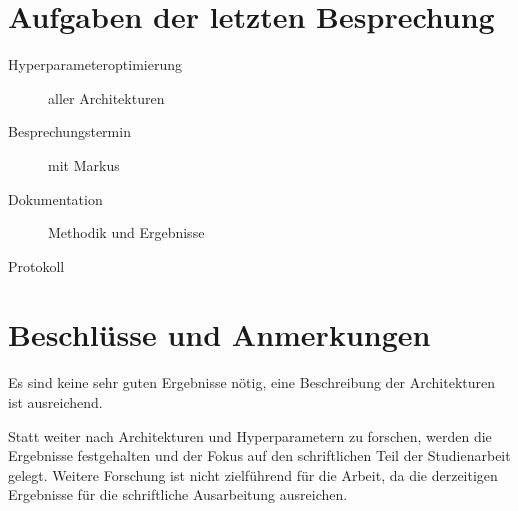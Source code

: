 
\newcommand{\Titel}{9. Protokoll}
\newcommand{\Teilnehmer}{Jonas Bürgel, Markus Reischl, Patrick Welter}
\newcommand{\DatumUndZeit}{04.04.2022 20:00-20:15}
\newcommand{\Ort}{Zoom Meeting}
\newcommand{\Thema}{Hyperparameteroptimierung}


\section{Aufgaben der letzten Besprechung}
\begin{description}
	\item[Hyperparameteroptimierung] aller Architekturen  \halfcheck
	\item[Besprechungstermin] mit Markus  \fullcheck
	\item[Dokumentation] Methodik und Ergebnisse  \halfcheck
	\item[Protokoll]  \fullcheck
\end{description}


\section{Beschlüsse und Anmerkungen}
\begin{description}[style=nextline]
	\item[Markus: Ergebnisse]
	Es sind keine sehr guten Ergebnisse nötig, eine Beschreibung der Architekturen ist ausreichend.
	
	\item[Weiteres Vorgehen]
	Statt weiter nach Architekturen und Hyperparametern zu forschen, werden die Ergebnisse festgehalten und der Fokus auf den schriftlichen Teil der Studienarbeit gelegt.
	Weitere Forschung ist nicht zielführend für die Arbeit, da die derzeitigen Ergebnisse für die schriftliche Ausarbeitung ausreichen.
\end{description}

